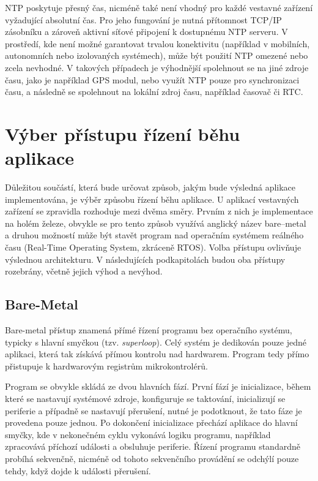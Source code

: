 NTP poskytuje přesný čas, nicméně také není vhodný pro každé vestavné zařízení vyžadující absolutní čas. Pro jeho fungování je nutná přítomnost TCP/IP zásobníku a zároveň aktivní síťové připojení k dostupnému NTP serveru. V prostředí, kde není možné garantovat trvalou konektivitu (například v mobilních, autonomních nebo izolovaných systémech), může být použití NTP omezené nebo zcela nevhodné. V takových případech je výhodnější spolehnout se na jiné zdroje času, jako je například GPS modul, nebo využít NTP pouze pro synchronizaci času, a následně se spolehnout na lokální zdroj času, například časovač či RTC.
\section{Výber přístupu řízení běhu aplikace}
Důležitou součástí, která bude určovat způsob, jakým bude výsledná aplikace implementována, je výběr způsobu řízení běhu aplikace. U aplikací vestavných zařízení se zpravidla rozhoduje mezi dvěma směry. Prvním z nich je implementace na holém železe, obvykle se pro tento způsob využívá anglický název bare--metal a druhou možností může být stavět program nad operačním systémem reálného času (Real-Time Operating System, zkráceně RTOS). Volba přístupu ovlivňuje výslednou architekturu. V následujících podkapitolách budou oba přístupy rozebrány, včetně jejich výhod a nevýhod. 


\subsection{Bare-Metal}
Bare-metal přístup znamená přímé řízení programu bez operačního systému, typicky s hlavní smyčkou (tzv. \emph{superloop}). Celý systém je dedikován pouze jedné aplikaci, která tak získává přímou kontrolu nad hardwarem. Program tedy přímo přistupuje k hardwarovým registrům mikrokontrolérů. 

Program se obvykle skládá ze dvou hlavních fází. První fází je inicializace, během které se nastavují systémové zdroje, konfiguruje se taktování, inicializují se periferie a případně se nastavují přerušení, nutné je podotknout, že tato fáze je provedena pouze jednou. Po dokončení inicializace přechází aplikace do hlavní smyčky, kde v nekonečném cyklu vykonává logiku programu, například zpracovává příchozí události a obsluhuje periferie. Řízení programu standardně probíhá sekvenčně, nicméně od tohoto sekvenčního provádění se odchýlí pouze tehdy, když dojde k události přerušení.

